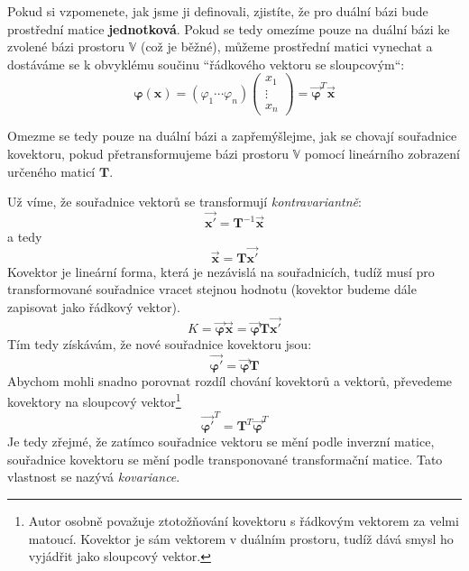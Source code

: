 \documentclass[a5paper,12pt]{amsbook}
\theoremstyle{definition}
\newcommand{\myvec}[1]{\bm{#1}}
\newcommand{\mycoord}[1]{\overrightarrow{\mathbf{#1}}}
\newcommand{\mymatrix}[1]{\mathbf{#1}}
\newcommand{\myspace}[1]{\mathbb{#1}}
\begin{document}
Pokud si vzpomenete, jak jsme ji definovali, zjistíte, že pro duální bázi bude
prostřední matice \textbf{jednotková}. Pokud se tedy omezíme pouze na duální
bázi ke zvolené bázi prostoru $\myspace{V}$ (což je běžné), můžeme prostřední
matici vynechat a dostáváme se k obvyklému součinu ``řádkového vektoru se
sloupcovým``:
\begin{equation*}
\myvec{\varphi}(\myvec{x}) = \left(\varphi_1 \cdots \varphi_n\right)
\left(\begin{array}{c}x_1 \\ \vdots \\ x_n\end{array}\right)
= \mycoord{\varphi}^T\mycoord{x}
\end{equation*}

\medskip\noindent
Omezme se tedy pouze na duální bázi a zapřemýšlejme, jak se chovají souřadnice
kovektoru, pokud přetransformujeme bázi prostoru $\myspace{V}$ pomocí lineárního
zobrazení určeného maticí $\mymatrix{T}$.

Už víme, že souřadnice vektorů se transformují \textit{kontravariantně}:
\begin{equation*}
\mycoord{x'} = \mymatrix{T}^{-1}\mycoord{x}
\end{equation*}
a tedy
\begin{equation*}
\mycoord{x} = \mymatrix{T}\mycoord{x'}
\end{equation*}
Kovektor je lineární forma, která je nezávislá na souřadnicích, tudíž musí pro
transformované souřadnice vracet stejnou hodnotu (kovektor budeme dále zapisovat
jako řádkový vektor). 
\begin{equation*}
K = \mycoord{\varphi}\mycoord{x} = \mycoord{\varphi}\mymatrix{T}\mycoord{x'}
\end{equation*}
Tím tedy získávám, že nové souřadnice kovektoru jsou:
\begin{equation*}
\mycoord{\varphi'} = \mycoord{\varphi}\mymatrix{T}
\end{equation*}
Abychom mohli snadno porovnat rozdíl chování kovektorů a vektorů, převedeme kovektory
na sloupcový vektor\footnote{
  Autor osobně považuje ztotožňování kovektoru s řádkovým vektorem za velmi matoucí.
  Kovektor je sám vektorem v duálním prostoru, tudíž dává smysl ho vyjádřit
  jako sloupcový vektor.}
\begin{equation*}
\mycoord{\varphi'}^T = \mymatrix{T}^T\mycoord{\varphi}^T
\end{equation*}
Je tedy zřejmé, že zatímco souřadnice vektoru se mění podle inverzní matice, souřadnice
kovektoru se mění podle transponované transformační matice. Tato vlastnost se nazývá
\textit{kovariance}.
\end{document}
